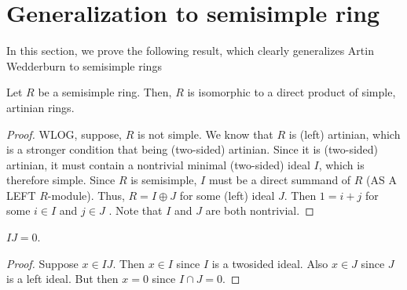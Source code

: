 \section{Generalization to semisimple ring}
    In this section, we prove the following result, which clearly generalizes Artin Wedderburn to semisimple rings
    \begin{theorem}
        Let $R$ be a semisimple ring. Then, $R$ is isomorphic to a direct product of simple, artinian rings.
    \end{theorem}
    \begin{proof}
        WLOG, suppose, $R$ is not simple. We know that $R$ is (left) artinian, which is a stronger condition that being (two-sided) artinian. Since it is (two-sided) artinian, it must contain a nontrivial minimal (two-sided) ideal $I$, which is therefore simple. Since $R$ is semisimple, $I$ must be a direct summand of $R$ (AS A LEFT $R$-module). Thus, $R = I \oplus J$ for some (left) ideal $J$. Then $1 = i + j$ for some $i \in I$ and $j \in J$ . Note that $I$ and $J$ are both nontrivial.
    \end{proof}

      \begin{claim}
        $I J = 0$.
      \end{claim}
      \begin{proof}
        Suppose $x \in I J$. Then $x \in I$ since $I$ is a twosided ideal. Also $x \in J$ since $J$ is a left ideal. But then $x = 0$ since $I \cap J = 0$.
      \end{proof}

